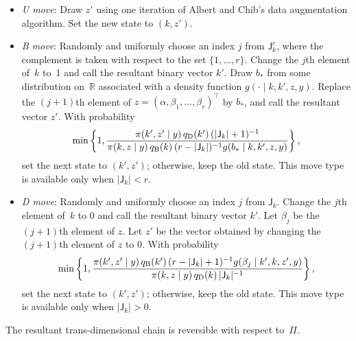\documentclass[12pt]{article}
\begin{document}
\begin{itemize}
	\item {\it U move}: 
	Draw $z'$ using one iteration of Albert and Chib's data augmentation algorithm.
	Set the new state to $(k,z')$.
	
	\item {\it B move}:
	Randomly and uniformly choose an index $j$ from $\mathsf{J}_k^c$, where the complement is taken with respect to the set $\{1,\dots,r\}$.
	Change the $j$th element of~$k$ to~1 and call the resultant binary vector $k'$.
	Draw $b_*$ from some distribution on~$\mathbb{R}$ associated with a density function $g(\cdot \mid k, k', z, y)$.
	Replace the $(j+1)$th element of $z = (\alpha, \beta_1, \dots, \beta_r)^{\top}$ by $b_*$, and call the resultant vector $z'$.
	With probability
	\[
	\min \left\{ 1, \frac{ \pi(k', z' \mid y) \, q_{\scriptsize\mbox{D}}(k') \,  (|\mathsf{J}_k|+1)^{-1} }{ \pi(k,z \mid y) \, q_{\scriptsize\mbox{B}}(k) \, (r - |\mathsf{J}_k|)^{-1} g(b_* \mid k, k', z, y)  }  \right\},
	\]
	set the next state to $(k',z')$;
	otherwise, keep the old state.
	This move type is available only when $|\mathsf{J}_k| < r$.
	
	\item {\it D move}:
	Randomly and uniformly choose an index $j$ from $\mathsf{J}_k$.
	Change the $j$th element of~$k$ to 0 and call the resultant binary vector $k'$.
	Let $\beta_j$ be the $(j+1)$th element of $z$.
	Let $z'$ be the vector obtained by changing the $(j+1)$th element of $z$ to 0.
	With probability
	\[
	\min \left\{ 1, \frac{\pi(k',z' \mid y) \, q_{\scriptsize\mbox{B}}(k') \, (r - |\mathsf{J}_k| + 1)^{-1} g(\beta_j \mid k', k, z', y)}{\pi(k, z \mid y) \, q_{\scriptsize\mbox{D}}(k) \, |\mathsf{J}_k|^{-1}} \right\},
	\]
	set the next state to $(k',z')$;
	otherwise, keep the old state.
	This move type is available only when $|\mathsf{J}_k| > 0$.
\end{itemize}

The resultant trans-dimensional chain is reversible with respect to~$\Pi$.
\end{document}
